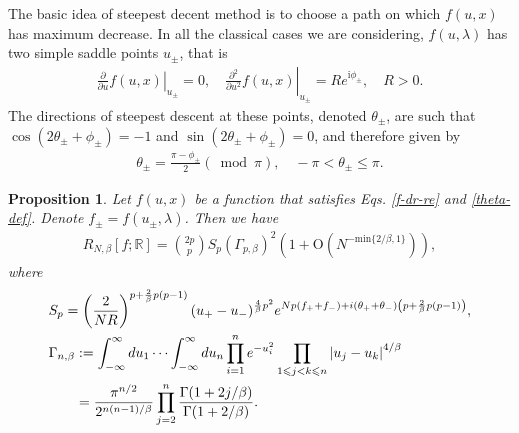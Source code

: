 \documentclass[11pt,a4paper]{article}
\numberwithin{equation}{section} %
\theoremstyle{plain}
\newtheorem{prop}{Proposition}
\theoremstyle{definition}
\numberwithin{prop}{section}
\numberwithin{cor}{section}
\numberwithin{remark}{section}
\begin{document}
The basic idea of steepest decent method is to choose a path on which $f(u,x)$ has maximum decrease. In all the classical cases we are considering, $f(u,\lambda)$ has two simple saddle points $u_{\pm}$, that is
	\begin{align}\label{f-dr-re}
		\left.\frac{\partial}{\partial u} f(u, x)\right|_{u_{ \pm}}=0,\left.\quad \frac{\partial^2}{\partial u^2} f(u, x)\right|_{u_{ \pm}}=R e^{\mathrm{i} \phi_{ \pm}}, \quad R>0 .
	\end{align}
	The directions of steepest descent at these points, denoted $\theta_{\pm}$, are such that $ \cos \left(2 \theta_{ \pm}+\phi_{ \pm}\right)=-1$ and $\sin \left(2 \theta_{ \pm}+\phi_{ \pm}\right)=0$, and therefore given by
	\begin{align}\label{theta-def}
		\theta_{ \pm}=\frac{\pi-\phi_{ \pm}}{2}(\bmod \pi), \quad-\pi<\theta_{ \pm} \leqslant \pi.
	\end{align}
\begin{prop}\label{sd-prop-G}
	Let $f (u, x)$ be a function that satisfies Eqs. \eqref{f-dr-re} and \eqref{theta-def}. Denote $f_{\pm}=f(u_{\pm},\lambda)$. Then we have
	\begin{align}\label{RNb}
		R_{N,\beta}[f;\mathbb{R}]=\binom{2p}{p}S_{p}(\Gamma_{p,\beta})^{2}\left(1+\mathrm{O}\left( N^{-\mathrm{min}\{2/\beta,1\}}\right)\right),
	\end{align}
	where 
	\begin{align}
		&S_p=\left({2\over NR}\right)^{p+{2\over\beta}p(p-1)}(u_+-u_-)^{{4\over\beta}p^2}e^{Np(f_++f_-)+i(\theta_{+}+\theta_{-})\left(p+{2\over\beta}p(p-1)\right)},\\
		&\begin{aligned}\label{Gam-nb}
			\Gamma_{n, \beta} & :=\int_{-\infty}^{\infty} d u_1 \cdots \int_{-\infty}^{\infty} d u_n \prod_{i=1}^n e^{-u_i^2} \prod_{1 \leqslant j<k \leqslant n}\left|u_j-u_k\right|^{4 / \beta} \\
			& =\frac{\pi^{n / 2}}{2^{n(n-1) / \beta}} \prod_{j=2}^n \frac{\Gamma(1+2 j / \beta)}{\Gamma(1+2 / \beta)} .
		\end{aligned}
	\end{align}
\end{prop}
\end{document}

